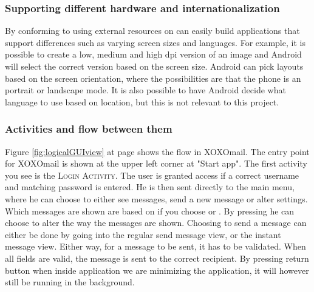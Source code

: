 \newpage 

\subsubsection{Supporting different hardware and internationalization}
By conforming to using external resources on can easily build applications that support differences such as varying screen sizes and languages. For example, it is possible to create a low, medium and high \gls{dpi} version of an image and Android will select the correct version based on the screen size. Android can pick layouts based on the screen orientation, where the possibilities are that the phone is an portrait or landscape mode. It is also possible to have Android decide what language to use based on location, but this is not relevant to this project. 



\newpage

\subsubsection{Activities and flow between them}

Figure \ref{fig:logicalGUIview} at page \pageref{fig:logicalGUIview} shows the flow in XOXOmail. The entry point for XOXOmail is shown at the upper left corner at "Start app". The first activity you see is the \textsc{Login Activity}. The user is granted access if a correct username and matching password is entered. He is then sent directly to the main menu, where he can choose to either see messages, send a new message or alter settings. Which messages are shown are based on if you choose  or . By pressing  he can choose to alter the way the messages are shown. Choosing to send a message can either be done by going into the regular send message view, or the instant message view. Either way, for a message to be sent, it has to be validated. When all fields are valid, the message is sent to the correct recipient. By pressing return button when inside application we are minimizing the application, it will however still be running in the background.

